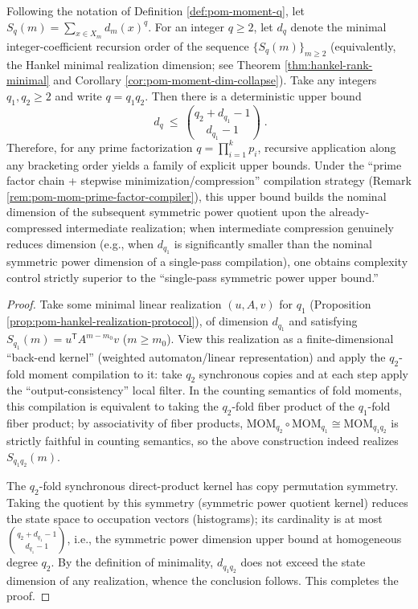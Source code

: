 \begin{proposition}\label{prop:pom-factorized-sympower-upper-bound}
Following the notation of Definition \ref{def:pom-moment-q}, let \(S_q(m)=\sum_{x\in X_m}d_m(x)^q\).
For an integer \(q\ge 2\), let \(d_q\) denote the minimal integer-coefficient recursion order of the sequence \(\{S_q(m)\}_{m\ge 2}\) (equivalently, the Hankel minimal realization dimension; see Theorem \ref{thm:hankel-rank-minimal} and Corollary \ref{cor:pom-moment-dim-collapse}).
Take any integers \(q_1,q_2\ge 2\) and write \(q=q_1q_2\).
Then there is a deterministic upper bound
\[
\boxed{\;
d_{q}\ \le\ \binom{q_2+d_{q_1}-1}{d_{q_1}-1}\; }.
\]
Therefore, for any prime factorization \(q=\prod_{i=1}^{k}p_i\), recursive application along any bracketing order yields a family of explicit upper bounds.
Under the ``prime factor chain + stepwise minimization/compression'' compilation strategy (Remark \ref{rem:pom-mom-prime-factor-compiler}), this upper bound builds the nominal dimension of the subsequent symmetric power quotient upon the already-compressed intermediate realization;
when intermediate compression genuinely reduces dimension (e.g., when \(d_{q_1}\) is significantly smaller than the nominal symmetric power dimension of a single-pass compilation), one obtains complexity control strictly superior to the ``single-pass symmetric power upper bound.''
\end{proposition}
\begin{proof}
Take some minimal linear realization \((u,A,v)\) for \(q_1\) (Proposition \ref{prop:pom-hankel-realization-protocol}), of dimension \(d_{q_1}\) and satisfying
\(
S_{q_1}(m)=u^{\mathsf T}A^{m-m_0}v
\) (\(m\ge m_0\)).
View this realization as a finite-dimensional ``back-end kernel'' (weighted automaton/linear representation) and apply the \(q_2\)-fold moment compilation to it: take \(q_2\) synchronous copies and at each step apply the ``output-consistency'' local filter.
In the counting semantics of fold moments, this compilation is equivalent to taking the \(q_2\)-fold fiber product of the \(q_1\)-fold fiber product; by associativity of fiber products,
\(
\mathrm{MOM}_{q_2}\circ \mathrm{MOM}_{q_1}\cong \mathrm{MOM}_{q_1q_2}
\)
is strictly faithful in counting semantics, so the above construction indeed realizes \(S_{q_1q_2}(m)\).
\par
The \(q_2\)-fold synchronous direct-product kernel has copy permutation symmetry.
Taking the quotient by this symmetry (symmetric power quotient kernel) reduces the state space to occupation vectors (histograms); its cardinality is at most
\(\binom{q_2+d_{q_1}-1}{d_{q_1}-1}\), i.e., the symmetric power dimension upper bound at homogeneous degree \(q_2\).
By the definition of minimality, \(d_{q_1q_2}\) does not exceed the state dimension of any realization, whence the conclusion follows. This completes the proof.
\end{proof}

